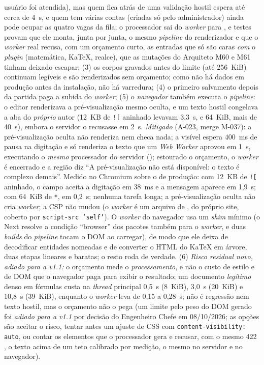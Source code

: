 usuário foi atendida), mas quem fica atrás de uma validação hostil espera até cerca de 4~s, e quem tem várias contas (criadas só pelo administrador) ainda pode ocupar as quatro vagas da fila; o processador sai do \emph{worker} para , e testes provam que ele monta, junta por junta, o mesmo \emph{pipeline} do renderizador e que o \emph{worker} real recusa, com um orçamento curto, as entradas que só são caras \emph{com} o \emph{plugin} (matemática, KaTeX, realce), que as mutações do Arquiteto M60 e M61 tinham deixado escapar; (3) os corpos gravados antes do limite (até 256~KiB) continuam legíveis e são renderizados sem orçamento; como não há dados em produção antes da instalação, não há varredura; (4) o primeiro salvamento depois da partida paga a subida do \emph{worker}; (5) o \emph{navegador} também executa o \emph{pipeline}: o editor renderizava a pré-visualização mesmo oculta, e um texto hostil congelava a aba do \emph{próprio} autor (12~KB de \texttt{![} aninhado levavam 3,3~s, e 64~KiB, mais de 40~s), embora o servidor o recusasse em 2~s. \emph{Mitigado} (A-023, merge M-037): a pré-visualização oculta não renderiza nem checa nada; a visível espera 400~ms de pausa na digitação e só renderiza o texto que um \emph{Web Worker} aprovou em 1~s, executando o \emph{mesmo} processador do servidor (); estourado o orçamento, o \emph{worker} é encerrado e a região diz ``A pré-visualização não está disponível: o texto é complexo demais''. Medido no Chromium sobre o  de produção: com 12~KB de \texttt{![} aninhado, o campo aceita a digitação em 38~ms e a mensagem aparece em 1,9~s; com 64~KiB de \texttt{*}, em 0,2~s; nenhuma tarefa longa; a pré-visualização oculta não cria \emph{worker}; a CSP não mudou (o \emph{worker} é um arquivo de , do próprio site, coberto por \texttt{script-src 'self'}). O \emph{worker} do navegador usa um \emph{shim} mínimo (o Next resolve a condição ``browser'' dos pacotes também para o \emph{worker}, e duas \emph{builds} do \emph{pipeline} tocam o DOM ao carregar), de modo que ele deixa de decodificar entidades nomeadas e de converter o HTML do KaTeX em árvore, duas etapas lineares e baratas; o resto roda de verdade. (6) \emph{Risco residual novo, adiado para a v1.1:} o orçamento mede o \emph{processamento}, e não o custo de estilo e de DOM que o navegador paga para exibir o resultado; um documento \emph{legítimo} denso em fórmulas custa na \emph{thread} principal 0,5~s (8~KiB), 3,0~s (20~KiB) e 10,8~s (39~KiB), enquanto o \emph{worker} leva de 0,15 a 0,28~s; não é regressão nem texto hostil, mas o orçamento não o pega (um limite pelo peso do DOM gerado foi \emph{adiado para a v1.1} por decisão do Engenheiro Chefe em 08/10/2026; as opções são aceitar o risco, tentar antes um ajuste de CSS com \texttt{content-visibility: auto}, ou contar os elementos que o processador gera e recusar, com o mesmo 422 , o texto acima de um teto calibrado por medição, o mesmo  no servidor e no navegador).

